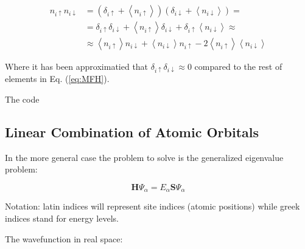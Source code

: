 \documentclass[amsmath,%
amssymb,prb,superscriptaddress]{revtex4}
\begin{document}
\begin{equation}\label{eq:MFH}
\begin{split}
n_{i\uparrow}n_{i\downarrow} & = \left( \delta_{i\uparrow}+\left\langle n_{i\uparrow}\right\rangle\right) 
\left( \delta_{i\downarrow}+\left\langle n_{i\downarrow}\right\rangle\right) = \\
 & = \delta_{i\uparrow}\delta_{i\downarrow} +  \left\langle n_{i\uparrow}\right\rangle\delta_{i\downarrow} + \delta_{i\uparrow}\left\langle n_{i\downarrow}\right\rangle \approx \\
 & \approx \left\langle n_{i\uparrow}\right\rangle n_{i\downarrow} + \left\langle n_{i\downarrow}\right\rangle n_{i\uparrow} - 2\left\langle n_{i\uparrow}\right\rangle\left\langle n_{i\downarrow}\right\rangle
\end{split}
\end{equation}

Where it has been approximatied that $\delta_{i\uparrow}\delta_{i\downarrow}\approx 0$ compared to the rest of elements in Eq. (\ref{eq:MFH}). 

The code


\subsection{Linear Combination of Atomic Orbitals}

%
%

In the more general case the problem to solve is the generalized eigenvalue problem:

\begin{equation}
\textbf{H}\Psi_{\alpha} = E_{\alpha}\textbf{S}\Psi_{\alpha}
\end{equation}

Notation: latin indices will represent site indices (atomic positions) while greek indices stand for energy levels.

The wavefunction  in real space:
\end{document}
